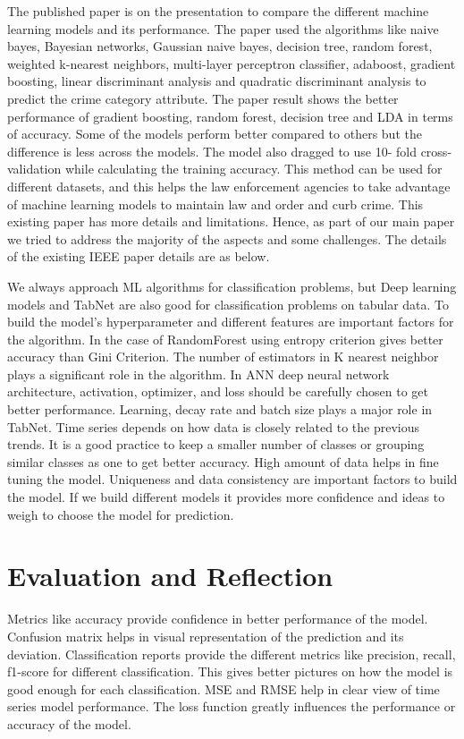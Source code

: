 \documentclass[conference,final,]{IEEEtran}
\begin{document}
The published paper is on the presentation to compare the different
machine learning models and its performance. The paper used the
algorithms like naive bayes, Bayesian networks, Gaussian naive bayes,
decision tree, random forest, weighted k-nearest neighbors, multi-layer
perceptron classifier, adaboost, gradient boosting, linear discriminant
analysis and quadratic discriminant analysis to predict the crime
category attribute. The paper result shows the better performance of
gradient boosting, random forest, decision tree and LDA in terms of
accuracy. Some of the models perform better compared to others but the
difference is less across the models. The model also dragged to use 10-
fold cross-validation while calculating the training accuracy. This
method can be used for different datasets, and this helps the law
enforcement agencies to take advantage of machine learning models to
maintain law and order and curb crime. This existing paper has more
details and limitations. Hence, as part of our main paper we tried to
address the majority of the aspects and some challenges. The details of
the existing IEEE paper details are as below.

We always approach ML algorithms for classification problems, but Deep
learning models and TabNet are also good for classification problems on
tabular data. To build the model's hyperparameter and different features
are important factors for the algorithm. In the case of RandomForest
using entropy criterion gives better accuracy than Gini Criterion. The
number of estimators in K nearest neighbor plays a significant role in
the algorithm. In ANN deep neural network architecture, activation,
optimizer, and loss should be carefully chosen to get better
performance. Learning, decay rate and batch size plays a major role in
TabNet. Time series depends on how data is closely related to the
previous trends. It is a good practice to keep a smaller number of
classes or grouping similar classes as one to get better accuracy. High
amount of data helps in fine tuning the model. Uniqueness and data
consistency are important factors to build the model. If we build
different models it provides more confidence and ideas to weigh to
choose the model for prediction.

\section{Evaluation and Reflection}\label{evaluation-and-reflection}

Metrics like accuracy provide confidence in better performance of the
model. Confusion matrix helps in visual representation of the prediction
and its deviation. Classification reports provide the different metrics
like precision, recall, f1-score for different classification. This
gives better pictures on how the model is good enough for each
classification. MSE and RMSE help in clear view of time series model
performance. The loss function greatly influences the performance or
accuracy of the model.
\end{document}
